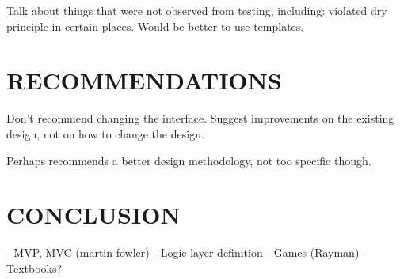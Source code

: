 \documentclass[10pt,twocolumn]{witseiepaper}
\begin{document}
Talk about things that were not observed from testing, including: violated dry principle in certain places. Would be better to use templates.

%
\section{RECOMMENDATIONS}
Don't recommend changing the interface. Suggest improvements on the existing design, not on how to change the design.

Perhaps recommends a better design methodology, not too specific though.



%
\section{CONCLUSION}


\balance

%



- MVP, MVC (martin fowler)
- Logic layer definition
- Games (Rayman)
- Textbooks?
\end{document}
